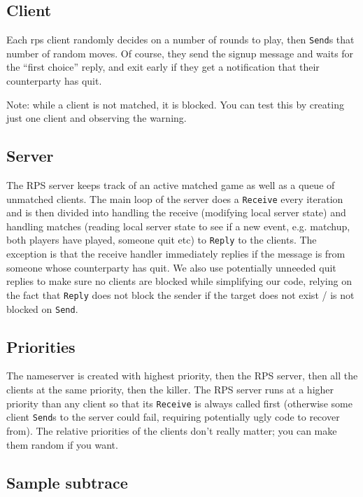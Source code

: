 \documentclass{article}
\begin{document}
\subsection*{Client}

Each rps client randomly decides on a number of rounds to play, then \texttt{Send}s that number of random moves. Of course, they send the signup message and waits for the ``first choice'' reply, and exit early if they get a notification that their counterparty has quit.

Note: while a client is not matched, it is blocked. You can test this by creating just one client and observing the warning.

\subsection*{Server}

The RPS server keeps track of an active matched game as well as a queue of unmatched clients. The main loop of the server does a \texttt{Receive} every iteration and is then divided into handling the receive (modifying local server state) and handling matches (reading local server state to see if a new event, e.g. matchup, both players have played, someone quit etc) to \texttt{Reply} to the clients. The exception is that the receive handler immediately replies if the message is from someone whose counterparty has quit. We also use potentially unneeded quit replies to make sure no clients are blocked while simplifying our code, relying on the fact that \texttt{Reply} does not block the sender if the target does not exist / is not blocked on \texttt{Send}.

\subsection*{Priorities}

The nameserver is created with highest priority, then the RPS server, then all the clients at the same priority, then the killer. The RPS server runs at a higher priority than any client so that its \texttt{Receive} is always called first (otherwise some client \texttt{Send}s to the server could fail, requiring potentially ugly code to recover from). The relative priorities of the clients don't really matter; you can make them random if you want.

\subsection*{Sample subtrace}
\end{document}
